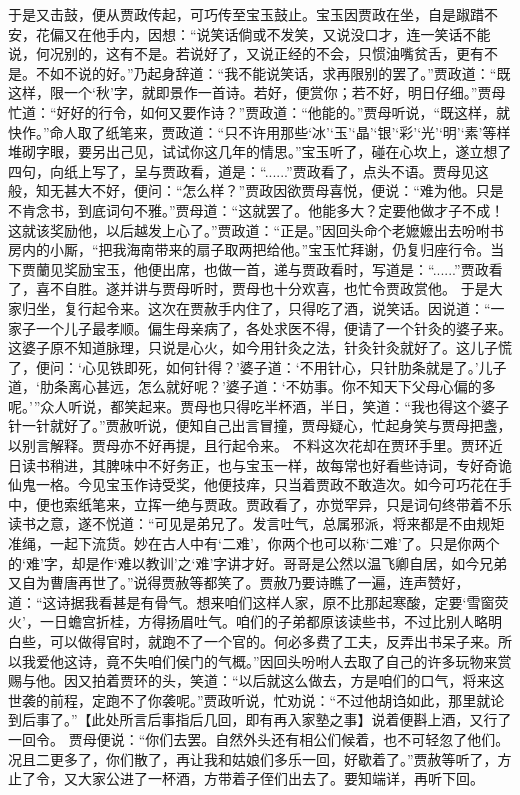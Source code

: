 \documentclass[12pt,oneside]{book}
\begin{document}
于是又击鼓，便从贾政传起，可巧传至宝玉鼓止。宝玉因贾政在坐，自是踧踖不安，花偏又在他手内，因想：“说笑话倘或不发笑，又说没口才，连一笑话不能说，何况别的，这有不是。若说好了，又说正经的不会，只惯油嘴贫舌，更有不是。不如不说的好。”乃起身辞道：“我不能说笑话，求再限别的罢了。”贾政道：“既这样，限一个‘秋’字，就即景作一首诗。若好，便赏你；若不好，明日仔细。”贾母忙道：“好好的行令，如何又要作诗？”贾政道：“他能的。”贾母听说，“既这样，就快作。”命人取了纸笔来，贾政道：“只不许用那些‘冰’‘玉’‘晶’‘银’‘彩’‘光’‘明’‘素’等样堆砌字眼，要另出己见，试试你这几年的情思。”宝玉听了，碰在心坎上，遂立想了四句，向纸上写了，呈与贾政看，道是：“......”贾政看了，点头不语。贾母见这般，知无甚大不好，便问：“怎么样？”贾政因欲贾母喜悦，便说：“难为他。只是不肯念书，到底词句不雅。”贾母道：“这就罢了。他能多大？定要他做才子不成！这就该奖励他，以后越发上心了。”贾政道：“正是。”因回头命个老嬷嬷出去吩咐书房内的小厮，“把我海南带来的扇子取两把给他。”宝玉忙拜谢，仍复归座行令。当下贾蘭见奖励宝玉，他便出席，也做一首，递与贾政看时，写道是：“......”贾政看了，喜不自胜。遂并讲与贾母听时，贾母也十分欢喜，也忙令贾政赏他。
于是大家归坐，复行起令来。这次在贾赦手内住了，只得吃了酒，说笑话。因说道：“一家子一个儿子最孝顺。偏生母亲病了，各处求医不得，便请了一个针灸的婆子来。这婆子原不知道脉理，只说是心火，如今用针灸之法，针灸针灸就好了。这儿子慌了，便问：‘心见铁即死，如何针得？’婆子道：‘不用针心，只针肋条就是了。’儿子道，‘肋条离心甚远，怎么就好呢？’婆子道：‘不妨事。你不知天下父母心偏的多呢。’”众人听说，都笑起来。贾母也只得吃半杯酒，半日，笑道：“我也得这个婆子针一针就好了。”贾赦听说，便知自己出言冒撞，贾母疑心，忙起身笑与贾母把盏，以别言解释。贾母亦不好再提，且行起令来。
不料这次花却在贾环手里。贾环近日读书稍进，其脾味中不好务正，也与宝玉一样，故每常也好看些诗词，专好奇诡仙鬼一格。今见宝玉作诗受奖，他便技痒，只当着贾政不敢造次。如今可巧花在手中，便也索纸笔来，立挥一绝与贾政。贾政看了，亦觉罕异，只是词句终带着不乐读书之意，遂不悦道：“可见是弟兄了。发言吐气，总属邪派，将来都是不由规矩准绳，一起下流货。妙在古人中有‘二难’，你两个也可以称‘二难’了。只是你两个的‘难’字，却是作‘难以教训’之‘难’字讲才好。哥哥是公然以温飞卿自居，如今兄弟又自为曹唐再世了。”说得贾赦等都笑了。贾赦乃要诗瞧了一遍，连声赞好，道：“这诗据我看甚是有骨气。想来咱们这样人家，原不比那起寒酸，定要‘雪窗荧火’，一日蟾宫折桂，方得扬眉吐气。咱们的子弟都原该读些书，不过比别人略明白些，可以做得官时，就跑不了一个官的。何必多费了工夫，反弄出书呆子来。所以我爱他这诗，竟不失咱们侯门的气概。”因回头吩咐人去取了自己的许多玩物来赏赐与他。因又拍着贾环的头，笑道：“以后就这么做去，方是咱们的口气，将来这世袭的前程，定跑不了你袭呢。”贾政听说，忙劝说：“不过他胡诌如此，那里就论到后事了。”【此处所言后事指后几回，即有再入家塾之事】说着便斟上酒，又行了一回令。
贾母便说：“你们去罢。自然外头还有相公们候着，也不可轻忽了他们。况且二更多了，你们散了，再让我和姑娘们多乐一回，好歇着了。”贾赦等听了，方止了令，又大家公进了一杯酒，方带着子侄们出去了。要知端详，再听下回。
 
\end{document}
